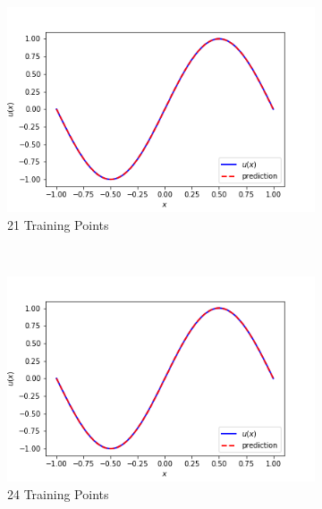 \documentclass{article}
\begin{document}
\begin{figure}[htbp]
    \begin{subfigure}{0.45\textwidth}
        \includegraphics[width=\textwidth]{figures/21TrainingPoints}
        \caption{21 Training Points}
    \end{subfigure}
        ~ %
    \begin{subfigure}{0.45\textwidth}
        \includegraphics[width=\textwidth]{figures/24TrainingPoints}
        \caption{24 Training Points}
    \end{subfigure}
~ %
    \begin{subfigure}{0.45\textwidth}

\end{subfigure}
\end{figure}
\end{document}
